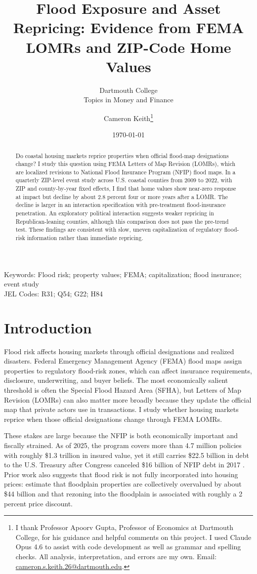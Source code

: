\documentclass[12pt]{article}
\title{Flood Exposure and Asset Repricing: Evidence from FEMA LOMRs and ZIP-Code Home Values}
\subtitle{Dartmouth College\\Topics in Money and Finance}
\author{Cameron Keith\thanks{I thank Professor Apoorv Gupta, Professor of Economics at Dartmouth College, for his guidance and helpful comments on this project. I used Claude Opus 4.6 to assist with code development as well as grammar and spelling checks. All analysis, interpretation, and errors are my own. \newline Email: \href{mailto:cameron.s.keith.26@dartmouth.edu}{cameron.s.keith.26@dartmouth.edu}.}}
\date{\today}
\begin{document}
\maketitle

\begin{abstract}
Do coastal housing markets reprice properties when official flood-map designations change? I study this question using FEMA Letters of Map Revision (LOMRs), which are localized revisions to National Flood Insurance Program (NFIP) flood maps. In a quarterly ZIP-level event study across U.S. coastal counties from 2009 to 2022, with ZIP and county-by-year fixed effects, I find that home values show near-zero response at impact but decline by about 2.8 percent four or more years after a LOMR. The decline is larger in an interaction specification with pre-treatment flood-insurance penetration. An exploratory political interaction suggests weaker repricing in Republican-leaning counties, although this comparison does not pass the pre-trend test. These findings are consistent with slow, uneven capitalization of regulatory flood-risk information rather than immediate repricing.
\end{abstract}

\doublespacing
\noindent Keywords: Flood risk; property values; FEMA; capitalization; flood insurance; event study
\\
JEL Codes: R31; Q54; G22; H84
\newpage
{}


\section{Introduction}\label{sec:intro}

Flood risk affects housing markets through official designations and realized disasters. Federal Emergency Management Agency (FEMA) flood maps assign properties to regulatory flood-risk zones, which can affect insurance requirements, disclosure, underwriting, and buyer beliefs. The most economically salient threshold is often the Special Flood Hazard Area (SFHA), but Letters of Map Revision (LOMRs) can also matter more broadly because they update the official map that private actors use in transactions. I study whether housing markets reprice when those official designations change through FEMA LOMRs.

These stakes are large because the NFIP is both economically important and fiscally strained. As of 2025, the program covers more than 4.7 million policies with roughly \$1.3 trillion in insured value, yet it still carries \$22.5 billion in debt to the U.S. Treasury after Congress canceled \$16 billion of NFIP debt in 2017 \citep{CRS2025_NFIPIntro,CRS2025_NFIPBorrowing}. Prior work also suggests that flood risk is not fully incorporated into housing prices: \citet{HinoBurke2021} estimate that floodplain properties are collectively overvalued by about \$44 billion and that rezoning into the floodplain is associated with roughly a 2 percent price discount.
\end{document}
